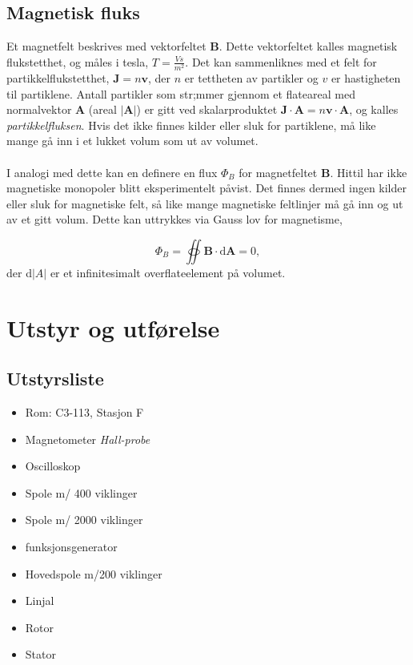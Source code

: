 \documentclass[12pt,norsk,a4paper]{article}
\begin{document}
\subsection{Magnetisk fluks}
Et magnetfelt beskrives med vektorfeltet $\textbf{B}$. Dette vektorfeltet kalles magnetisk flukstetthet, og måles i tesla, $T = \frac{Vs}{m^2}$. Det kan sammenliknes med et felt for partikkelflukstetthet, $\textbf{J} = n\textbf{v}$, der $n$ er tettheten av partikler og $v$ er hastigheten til partiklene. Antall partikler som str;mmer gjennom et flateareal med normalvektor $\textbf{A}$ (areal $|\textbf{A}|$) er gitt ved skalarproduktet $\textbf{J} \cdot \textbf{A} = n\textbf{v}\cdot\textbf{A}$, og kalles \textit{partikkelfluksen}. Hvis det ikke finnes kilder eller sluk for partiklene, må like mange gå inn i et lukket volum som ut av volumet. \\
\\
I analogi med dette kan en definere en flux \textbf{$\Phi_B$} for magnetfeltet $\textbf{B}$. Hittil har ikke magnetiske monopoler blitt eksperimentelt påvist. Det finnes dermed ingen kilder eller sluk for magnetiske felt, så like mange magnetiske feltlinjer må gå inn og ut av et gitt volum. Dette kan uttrykkes via Gauss lov for magnetisme,

\begin{equation}
\Phi_B = \oiint \textbf{B}\cdot \textrm{d}\textbf{A} = 0,
\end{equation}
der d\textbf{$|A|$} er et infinitesimalt overflateelement på volumet.\\

\clearpage
\section{Utstyr og utførelse}

\subsection*{Utstyrsliste}
    \begin{itemize}
    \item Rom: C3-113, Stasjon F
    \item Magnetometer \textit{Hall-probe}
    \item Oscilloskop \textit{}
    \item Spole m/ 400 viklinger
    \item Spole m/ 2000 viklinger
    \item funksjonsgenerator
    \item Hovedspole m/200 viklinger
    \item Linjal
    \item Rotor
    \item Stator
    \end{itemize}
\end{document}
